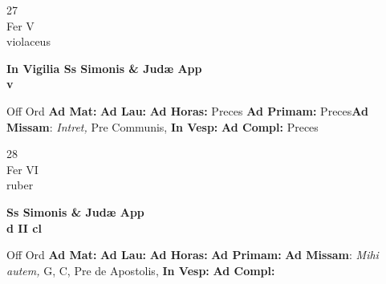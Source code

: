 \documentclass[10pt, openany]{book}
\begin{document}
    \begin{center}
        \begin{minipage}{3.5in}
            \vspace{2em}
            \begin{minipage}{0.5in}
                {\Huge 27} \\
                {\normalsize Fer V} \\
                {\normalsize violaceus}
            \end{minipage}
            \begin{minipage}{3.0in}
                \textbf{ \large In Vigilia Ss Simonis \& Judæ App \\
                \textnormal{\normalsize v}} \\ 
            \end{minipage}
            \begin{justify}Off Ord
                \textbf{Ad Mat: }
                \textbf{Ad Lau: }
                \textbf{Ad Horas: }Preces
                \textbf{Ad Primam: }Preces\textbf{Ad Missam}: \textit{Intret,} Pre Communis,  
                \textbf{In Vesp: }
                \textbf{Ad Compl: }Preces
            \end{justify}
        \end{minipage}
    \end{center}

    \begin{center}
        \begin{minipage}{3.5in}
            \vspace{2em}
            \begin{minipage}{0.5in}
                {\Huge 28} \\
                {\normalsize Fer VI} \\
                {\normalsize ruber}
            \end{minipage}
            \begin{minipage}{3.0in}
                \textbf{ \large Ss Simonis \& Judæ App \\
                \textnormal{\normalsize d II cl}} \\ 
            \end{minipage}
            \begin{justify}Off Ord
                \textbf{Ad Mat: }
                \textbf{Ad Lau: }
                \textbf{Ad Horas: }
                \textbf{Ad Primam: }\textbf{Ad Missam}: \textit{Mihi autem,} G, C, Pre de Apostolis,  
                \textbf{In Vesp: }
                \textbf{Ad Compl: }
            \end{justify}
        \end{minipage}
    \end{center}
\end{document}
